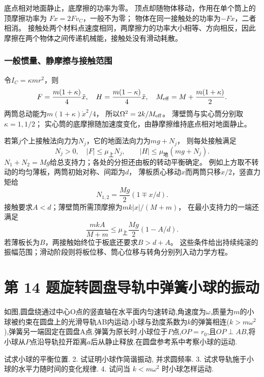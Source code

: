 \documentclass[UTF8,fontset=fandol,a4paper,11pt]{ctexart}
\newcommand{\tagline}[1]{\noindent{\small\color{muted}#1}\par}
\begin{document}
底点相对地面静止，底摩擦的功率为零。
顶点却随物体移动，作用在单个筒上的顶摩擦功率为
$F\dot x=2Fv_C$，一般不为零；
物体在同一接触处的功率为$-F\dot x$，二者相消。
接触处两个材料点速度相同，两摩擦力的功率大小相等、方向相反，因此摩擦在两个物体之间传递机械能，接触处没有滑动耗散。

\subsubsection*{一般惯量、静摩擦与接触范围}
令$I_C=\kappa mr^2$，则
\[
F=\frac{m(1+\kappa)}4\ddot x,\quad
H=\frac{m(1-\kappa)}4\ddot x,
\quad M_{\rm eff}=M+\frac{m(1+\kappa)}2.
\]
两筒总动能为$m(1+\kappa)\dot x^2/4$，
所以$\Omega^2=2k/M_{\rm eff}$。
薄壁筒与实心筒分别取$\kappa=1,1/2$；
实心筒的底摩擦随加速度变化，由静摩擦维持底点相对地面静止。

若第$j$个上接触法向力为$N_j$，它的地面法向力为$mg+N_j$，
则每处接触满足
\[
N_j>0,\quad |F|\le\mu_{\text{上}}N_j,
\qquad |H|\le\mu_{\text{地}}(mg+N_j).
\]
$N_1+N_2=Mg$给总支持力；各处的分担还由板的转动平衡确定。
例如上方取不转动的均匀薄板，两筒初始对称、间距为$d$，
薄板质心移动$x$而两筒只移$x/2$，竖直力矩给
\[
N_{1,2}=\frac{Mg}{2}(1\mp x/d).
\]
接触要求$A<d$；薄壁筒所需顶摩擦为$mk|x|/(M+m)$，
在最小支持力的一端还满足
\[
\frac{mkA}{M+m}\le\mu_{\text{上}}\frac{Mg}{2}(1-A/d).
\]
若薄板长为$B$，两接触始终位于板底还要求$B>d+A$。
这些条件给出持续纯滚的振幅范围；滑动阶段则将板位移、筒心位移与转角分别列入动力学方程。




\section*{第 14 题\quad 旋转圆盘导轨中弹簧小球的振动}

\tagline{M-07-14}

如图,圆盘绕通过中心O点的竖直轴在水平面内匀速转动,角速度为\(\omega\),质量为\(m\)的小球被约束在圆盘上的光滑导轨AB内运动.小球与劲度系数为\(k\)的弹簧相连(\(k>m\omega^{2}\)),弹簧另一端固定在圆盘A点.弹簧为原长时,小球位于\(P\)点,\(OP=r_{0}\),且\(OP\perp AB\),将小球从\(P\)点沿导轨拉开距离\(a\)后从静止释放.在圆盘参考系中考察小球的运动.

试求小球的平衡位置. 2. 试证明小球作简谐振动, 并求圆频率. 3.
试求导轨施于小球的水平力随时间的变化规律. 4. 试问当 \(k<m \omega^{2}\)
时小球怎样运动.
\end{document}
